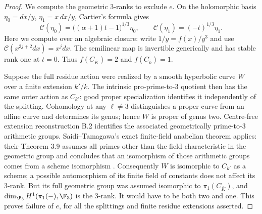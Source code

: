 \begin{proof}
We compute the geometric $3$-ranks to exclude $e$. On the holomorphic
basis $\eta_0=dx/y$, $\eta_1=x\,dx/y$, Cartier's formula gives
\[
 \mathcal C(\eta_0)=\bigl((\alpha+1)t-1\bigr)^{1/3}\eta_0,
 \qquad
 \mathcal C(\eta_1)=(-t)^{1/3}\eta_1.
\]
Here we compute over an algebraic closure: write $1/y=f(x)/y^3$
and use $\mathcal C(x^{3j+2}dx)=x^jdx$. The semilinear map is invertible
generically and has stable rank one at $t=0$. Thus
$f(C_{\bar K})=2$ and $f(C_{\bar k})=1$.

Suppose the full residue action were realized by a smooth hyperbolic
curve $W$ over a finite extension $k'/k$. The intrinsic pro-prime-to-$3$
quotient then has the same outer action as $C_{k'}$: good proper
specialization identifies it independently of the splitting. Cohomology
at any $\ell\ne3$ distinguishes a proper curve from an affine curve
and determines its genus; hence $W$ is proper of genus two. Centre-free
extension reconstruction B.2 identifies the associated geometrically
prime-to-$3$ arithmetic groups. Saidi--Tamagawa's exact finite-field
anabelian theorem applies: their Theorem 3.9 assumes all primes other
than the field characteristic in the geometric group and concludes that
an isomorphism of those arithmetic groups comes from a scheme
isomorphism \citep[Theorem 3.9]{A_SaidiTamagawa2009}.
Consequently $W$ is isomorphic to $C_{k'}$ as a scheme; a possible
automorphism of its finite field of constants does not affect its
$3$-rank. But its full geometric group was assumed isomorphic to
$\pi_1(C_{\bar K})$, and
$\dim_{\F_3}H^1(\pi_1(-),\F_3)$ is the $3$-rank. It would have
to be both two and one. This proves failure of $e$, for all the
splittings and finite residue extensions asserted.
\end{proof}

